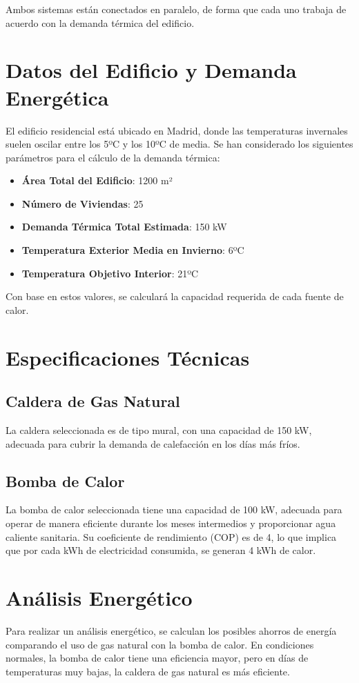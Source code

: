 \documentclass[a4paper,10pt,twocolumn]{article}
\begin{document}
\begin{Form}
	Ambos sistemas están conectados en paralelo, de forma que cada uno trabaja de acuerdo con la demanda térmica del edificio.

	\section{Datos del Edificio y Demanda Energética}
	El edificio residencial está ubicado en Madrid, donde las temperaturas invernales suelen oscilar entre los 5ºC y los 10ºC de media. Se han considerado los siguientes parámetros para el cálculo de la demanda térmica:

	\begin{itemize}
		\item \textbf{Área Total del Edificio}: 1200 m²
		\item \textbf{Número de Viviendas}: 25
		\item \textbf{Demanda Térmica Total Estimada}: 150 kW
		\item \textbf{Temperatura Exterior Media en Invierno}: 6ºC
		\item \textbf{Temperatura Objetivo Interior}: 21ºC
	\end{itemize}

	Con base en estos valores, se calculará la capacidad requerida de cada fuente de calor.

	\section{Especificaciones Técnicas}
	\subsection{Caldera de Gas Natural}
	La caldera seleccionada es de tipo mural, con una capacidad de 150 kW, adecuada para cubrir la demanda de calefacción en los días más fríos.

	\subsection{Bomba de Calor}
	La bomba de calor seleccionada tiene una capacidad de 100 kW, adecuada para operar de manera eficiente durante los meses intermedios y proporcionar agua caliente sanitaria. Su coeficiente de rendimiento (COP) es de 4, lo que implica que por cada kWh de electricidad consumida, se generan 4 kWh de calor.

	\section{Análisis Energético}
	Para realizar un análisis energético, se calculan los posibles ahorros de energía comparando el uso de gas natural con la bomba de calor. En condiciones normales, la bomba de calor tiene una eficiencia mayor, pero en días de temperaturas muy bajas, la caldera de gas natural es más eficiente.


\end{Form}
\end{document}
